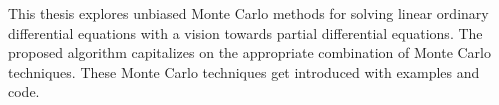 This thesis explores unbiased Monte Carlo
methods for solving linear
ordinary differential equations with a vision towards 
partial differential equations.
The proposed algorithm capitalizes on the appropriate
combination of Monte Carlo techniques.
These Monte Carlo techniques get introduced with examples
and code.
